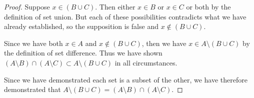 \documentclass[main.tex]{subfiles}
\begin{document}
\begin{proof}
	Suppose \(x \in (B \cup C)\). Then either \(x \in B\) or \(x \in C\) or
	both by the definition of set union. But each of these possibilities
	contradicts what we have already established, so the supposition is
	false and \(x \notin (B \cup C)\).

	Since we have both \(x \in A\) and \(x \notin (B \cup C)\), then we have
	\(x \in A \setminus (B \cup C)\) by the definition of set difference.
	Thus we have shown
	\((A \setminus B) \cap (A \setminus C) \subset A \setminus (B \cup C)\)
	in all circumstances.

	\medskip
	Since we have demonstrated each set is a subset of the other, we have
	therefore demonstrated that
	\(A \setminus (B \cup C) = (A \setminus B) \cap (A \setminus C)\).
\end{proof}

\bigbreak{}
\end{document}
